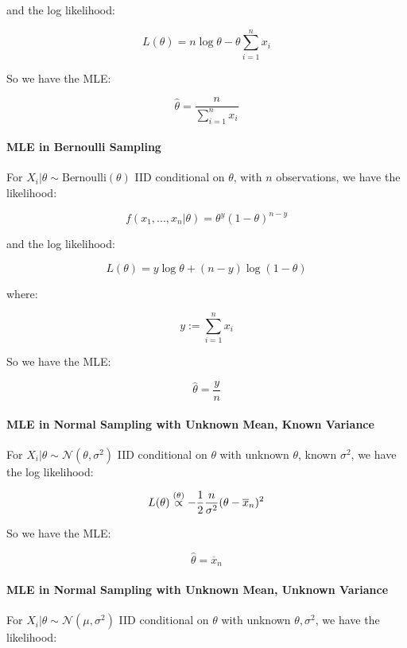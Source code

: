\documentclass[a4paper]{article}
\begin{document}
                and the log likelihood:

                \[
                    L(\theta) = n\log{\theta} - \theta\sum_{i=1}^n x_i
                \]

                So we have the MLE:

                \[
                    \widehat \theta = \frac{n}{\sum\limits_{i=1}^n x_i}
                \]

            \paragraph{MLE in Bernoulli Sampling}
                For $X_i | \theta \sim \text{Bernoulli}(\theta)$ IID conditional
                on $\theta$, with $n$ observations, we have the likelihood:

                \[
                    f(x_1, ..., x_n | \theta) = \theta^y (1 - \theta)^{n - y}
                \]

                and the log likelihood:

                \[
                    L(\theta) = y\log{\theta} + (n - y)\log(1 - \theta)
                \]

                where:

                \[
                    y := \sum_{i=1}^n x_i
                \]

                So we have the MLE:

                \[
                    \widehat \theta = \frac{y}{n}
                \]

            \paragraph{MLE in Normal Sampling with Unknown Mean, Known Variance}
                For $X_i | \theta \sim \mathcal{N}(\theta, \sigma^2)$ IID
                conditional on $\theta$ with unknown $\theta$, known $\sigma^2$,
                we have the log likelihood:

                \[
                    L(\theta) \stackrel{({\theta})}{\propto} -\frac{1}{2}\frac{n}{\sigma^2}
                    (\theta - \overline x_n)^2
                \]

                So we have the MLE:

                \[
                    \widehat \theta = \overline x_n
                \]

            \paragraph{MLE in Normal Sampling with Unknown Mean, Unknown
            Variance}
                For $X_i | \theta \sim \mathcal{N}(\mu, \sigma^2)$ IID
                conditional on $\theta$ with unknown $\theta, \sigma^2$, we have
                the likelihood:
\end{document}
